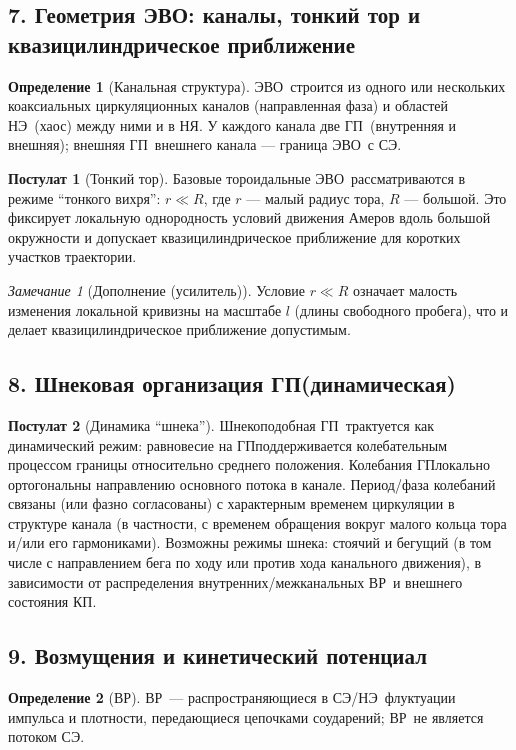\documentclass[12pt]{article}
\newcommand{\SE}{\mbox{\textsc{СЭ}}}
\newcommand{\EVO}{\mbox{\textsc{ЭВО}}}
\newcommand{\GP}{\mbox{\textsc{ГП}}}
\newcommand{\KP}{\mbox{\textsc{КП}}}
\newcommand{\VR}{\mbox{\textsc{ВР}}}
\newcommand{\NE}{\mbox{\textsc{НЭ}}}
\newcommand{\NY}{\mbox{\textsc{НЯ}}}
\theoremstyle{definition}
\newtheorem{definition}{Определение}[section]
\newtheorem{postulate}{Постулат}[section]
\theoremstyle{plain}
\theoremstyle{remark}
\newtheorem{remark}{Замечание}[section]
\begin{document}
\subsection{7. Геометрия \EVO: каналы, тонкий тор и квазицилиндрическое приближение}
\begin{definition}[Канальная структура]
\EVO\ строится из одного или нескольких коаксиальных циркуляционных каналов (направленная фаза) и областей \NE\ (хаос)
между ними и в \NY. У каждого канала две \GP\ (внутренняя и внешняя); внешняя \GP\ внешнего канала — граница \EVO\ с \SE.
\end{definition}

\begin{postulate}[Тонкий тор]
Базовые тороидальные \EVO\ рассматриваются в режиме ``тонкого вихря'': \(r\ll R\),
где \(r\) — малый радиус тора, \(R\) — большой. Это фиксирует локальную однородность условий движения Амеров вдоль большой окружности
и допускает квазицилиндрическое приближение для коротких участков траектории.
\end{postulate}

\begin{remark}[Дополнение (усилитель)]
Условие \(r\ll R\) означает малость изменения локальной кривизны на масштабе \(l\) (длины свободного пробега),
что и делает квазицилиндрическое приближение допустимым.
\end{remark}

\subsection{8. Шнековая организация \GP (динамическая)}
\begin{postulate}[Динамика ``шнека'']
Шнекоподобная \GP\ трактуется как динамический режим: равновесие на \GP поддерживается колебательным процессом границы
относительно среднего положения. Колебания \GP локально ортогональны направлению основного потока в канале.
Период/фаза колебаний связаны (или фазно согласованы) с характерным временем циркуляции в структуре канала
(в частности, с временем обращения вокруг малого кольца тора и/или его гармониками).
Возможны режимы шнека: стоячий и бегущий (в том числе с направлением бега по ходу или против хода канального движения),
в зависимости от распределения внутренних/межканальных \VR\ и внешнего состояния \KP.
\end{postulate}

\subsection{9. Возмущения и кинетический потенциал}
\begin{definition}[\VR]
\VR\ — распространяющиеся в \SE/\NE\ флуктуации импульса и плотности, передающиеся цепочками соударений;
\VR\ не является потоком \SE.
\end{definition}
\end{document}
